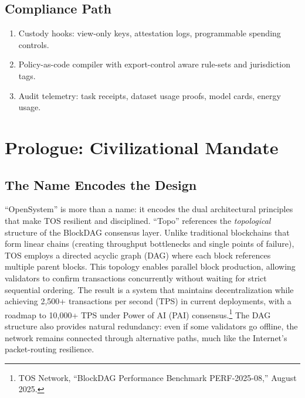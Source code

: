 \documentclass[11pt]{article}
\begin{document}
\subsection{Compliance Path}
\begin{enumerate}[noitemsep]
  \item Custody hooks: view-only keys, attestation logs, programmable spending controls.
  \item Policy-as-code compiler with export-control aware rule-sets and jurisdiction tags.
  \item Audit telemetry: task receipts, dataset usage proofs, model cards, energy usage.
\end{enumerate}

\section{Prologue: Civilizational Mandate}
\subsection{The Name Encodes the Design}
``OpenSystem'' is more than a name: it encodes the dual architectural principles that make TOS resilient and disciplined. ``Topo'' references the \emph{topological} structure of the BlockDAG consensus layer. Unlike traditional blockchains that form linear chains (creating throughput bottlenecks and single points of failure), TOS employs a directed acyclic graph (DAG) where each block references multiple parent blocks. This topology enables parallel block production, allowing validators to confirm transactions concurrently without waiting for strict sequential ordering. The result is a system that maintains decentralization while achieving 2,500+ transactions per second (TPS) in current deployments, with a roadmap to 10,000+ TPS under Power of AI (PAI) consensus.\footnote{TOS Network, ``BlockDAG Performance Benchmark PERF-2025-08,'' August 2025.} The DAG structure also provides natural redundancy: even if some validators go offline, the network remains connected through alternative paths, much like the Internet's packet-routing resilience.
\end{document}
